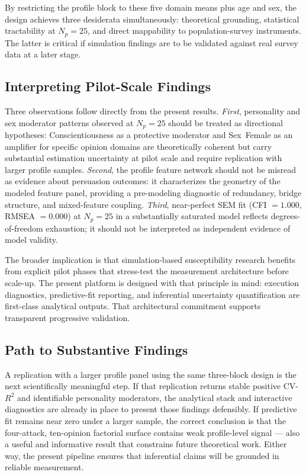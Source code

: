 \documentclass[11pt,a4paper]{article}
\begin{document}
By restricting the profile block to these five domain means plus age and sex, the design achieves three desiderata simultaneously: theoretical grounding, statistical tractability at $N_p = 25$, and direct mappability to population-survey instruments. The latter is critical if simulation findings are to be validated against real survey data at a later stage.

\subsection{Interpreting Pilot-Scale Findings}

Three observations follow directly from the present results. \emph{First}, personality and sex moderator patterns observed at $N_p = 25$ should be treated as directional hypotheses: Conscientiousness as a protective moderator and Sex~Female as an amplifier for specific opinion domains are theoretically coherent but carry substantial estimation uncertainty at pilot scale and require replication with larger profile samples. \emph{Second}, the profile feature network should not be misread as evidence about persuasion outcomes: it characterizes the geometry of the modeled feature panel, providing a pre-modeling diagnostic of redundancy, bridge structure, and mixed-feature coupling. \emph{Third}, near-perfect SEM fit (CFI $= 1.000$, RMSEA $= 0.000$) at $N_p = 25$ in a substantially saturated model reflects degrees-of-freedom exhaustion; it should not be interpreted as independent evidence of model validity.

The broader implication is that simulation-based susceptibility research benefits from explicit pilot phases that stress-test the measurement architecture before scale-up. The present platform is designed with that principle in mind: execution diagnostics, predictive-fit reporting, and inferential uncertainty quantification are first-class analytical outputs. That architectural commitment supports transparent progressive validation.

\subsection{Path to Substantive Findings}

A replication with a larger profile panel using the same three-block design is the next scientifically meaningful step. If that replication returns stable positive CV-$R^2$ and identifiable personality moderators, the analytical stack and interactive diagnostics are already in place to present those findings defensibly. If predictive fit remains near zero under a larger sample, the correct conclusion is that the four-attack, ten-opinion factorial surface contains weak profile-level signal --- also a useful and informative result that constrains future theoretical work. Either way, the present pipeline ensures that inferential claims will be grounded in reliable measurement.
\end{document}
